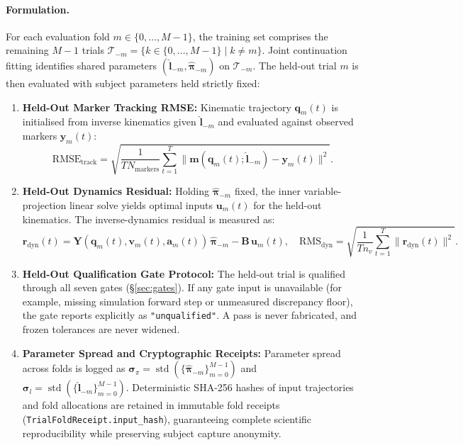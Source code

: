 \documentclass[11pt,a4paper]{article}
\begin{document}
\paragraph{Formulation.}
For each evaluation fold $m \in \{0, \dots, M-1\}$, the training set comprises the remaining $M-1$ trials $\mathcal{T}_{-m} = \{k \in \{0, \dots, M-1\} \mid k \ne m\}$. Joint continuation fitting identifies shared parameters $(\hat{\mathbf{l}}_{-m}, \hat{\boldsymbol{\pi}}_{-m})$ on $\mathcal{T}_{-m}$. The held-out trial $m$ is then evaluated with subject parameters held strictly fixed:
\begin{enumerate}[nosep]
  \item \textbf{Held-Out Marker Tracking RMSE:} Kinematic trajectory $\mathbf{q}_m(t)$ is initialised from inverse kinematics given $\hat{\mathbf{l}}_{-m}$ and evaluated against observed markers $\mathbf{y}_m(t)$:
  \begin{equation}
    \mathrm{RMSE}_{\text{track}} = \sqrt{\frac{1}{T N_{\text{markers}}} \sum_{t=1}^T \|\mathbf{m}(\mathbf{q}_m(t); \hat{\mathbf{l}}_{-m}) - \mathbf{y}_m(t)\|^2}.
  \end{equation}
  \item \textbf{Held-Out Dynamics Residual:} Holding $\hat{\boldsymbol{\pi}}_{-m}$ fixed, the inner variable-projection linear solve yields optimal inputs $\mathbf{u}_m(t)$ for the held-out kinematics. The inverse-dynamics residual is measured as:
  \begin{equation}
    \mathbf{r}_{\text{dyn}}(t) = \mathbf{Y}(\mathbf{q}_m(t), \mathbf{v}_m(t), \mathbf{a}_m(t))\,\hat{\boldsymbol{\pi}}_{-m} - \mathbf{B}\,\mathbf{u}_m(t), \quad
    \mathrm{RMS}_{\text{dyn}} = \sqrt{\frac{1}{T n_v} \sum_{t=1}^T \|\mathbf{r}_{\text{dyn}}(t)\|^2}.
  \end{equation}
  \item \textbf{Held-Out Qualification Gate Protocol:} The held-out trial is qualified through all seven gates (\S\ref{sec:gates}). If any gate input is unavailable (for example, missing simulation forward step or unmeasured discrepancy floor), the gate reports explicitly as \texttt{"unqualified"}. A pass is never fabricated, and frozen tolerances are never widened.
  \item \textbf{Parameter Spread and Cryptographic Receipts:} Parameter spread across folds is logged as $\boldsymbol{\sigma}_\pi = \operatorname{std}(\{\hat{\boldsymbol{\pi}}_{-m}\}_{m=0}^{M-1})$ and $\boldsymbol{\sigma}_l = \operatorname{std}(\{\hat{\mathbf{l}}_{-m}\}_{m=0}^{M-1})$. Deterministic SHA-256 hashes of input trajectories and fold allocations are retained in immutable fold receipts (\texttt{TrialFoldReceipt.input\_hash}), guaranteeing complete scientific reproducibility while preserving subject capture anonymity.
\end{enumerate}
\end{document}
